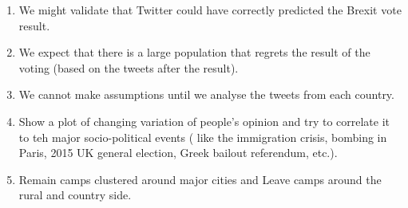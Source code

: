\documentclass{article}
\begin{document}
\begin{enumerate}
\item We might validate that Twitter could have correctly predicted the Brexit vote result.
\item We expect that there is a large population that regrets the result of the voting (based on the tweets after the result).
\item We cannot make assumptions until we analyse the tweets from each country.
\item Show a plot of changing variation of people's opinion and try to correlate it to teh major socio-political events ( like the immigration crisis, bombing in Paris, 2015 UK general election, Greek bailout referendum, etc.).
\item Remain camps clustered around major cities and Leave camps around the rural and country side.

\end{enumerate}
\end{document}
